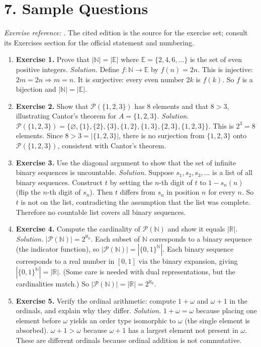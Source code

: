 \section*{7. Sample Questions}
\emph{Exercise reference:} \cite{set_ref1}. The cited edition is the source for the exercise set; consult its Exercises section for the official statement and numbering.
\begin{enumerate}[leftmargin=*,itemsep=0.9em]
\item \textbf{Exercise 1.} Prove that $|\mathbb{N}|=|\mathbb{E}|$ where $\mathbb{E}=\{2,4,6,\ldots\}$ is the set of even positive integers. \emph{Solution.} Define $f\colon\mathbb{N}\to\mathbb{E}$ by $f(n)=2n$. This is injective: $2m=2n\Rightarrow m=n$. It is surjective: every even number $2k$ is $f(k)$. So $f$ is a bijection and $|\mathbb{N}|=|\mathbb{E}|$.

\item \textbf{Exercise 2.} Show that $\mathcal{P}(\{1,2,3\})$ has $8$ elements and that $8>3$, illustrating Cantor's theorem for $A=\{1,2,3\}$. \emph{Solution.} $\mathcal{P}(\{1,2,3\})=\{\varnothing,\{1\},\{2\},\{3\},\{1,2\},\{1,3\},\{2,3\},\{1,2,3\}\}$. This is $2^3=8$ elements. Since $8>3=|\{1,2,3\}|$, there is no surjection from $\{1,2,3\}$ onto $\mathcal{P}(\{1,2,3\})$, consistent with Cantor's theorem.

\item \textbf{Exercise 3.} Use the diagonal argument to show that the set of infinite binary sequences is uncountable. \emph{Solution.} Suppose $s_1,s_2,s_3,\ldots$ is a list of all binary sequences. Construct $t$ by setting the $n$-th digit of $t$ to $1-s_n(n)$ (flip the $n$-th digit of $s_n$). Then $t$ differs from $s_n$ in position $n$ for every $n$. So $t$ is not on the list, contradicting the assumption that the list was complete. Therefore no countable list covers all binary sequences.

\item \textbf{Exercise 4.} Compute the cardinality of $\mathcal{P}(\mathbb{N})$ and show it equals $|\mathbb{R}|$. \emph{Solution.} $|\mathcal{P}(\mathbb{N})|=2^{\aleph_0}$. Each subset of $\mathbb{N}$ corresponds to a binary sequence (the indicator function), so $|\mathcal{P}(\mathbb{N})|=|\{0,1\}^{\mathbb{N}}|$. Each binary sequence corresponds to a real number in $[0,1]$ via the binary expansion, giving $|\{0,1\}^{\mathbb{N}}|=|\mathbb{R}|$. (Some care is needed with dual representations, but the cardinalities match.) So $|\mathcal{P}(\mathbb{N})|=|\mathbb{R}|=2^{\aleph_0}$.

\item \textbf{Exercise 5.} Verify the ordinal arithmetic: compute $1+\omega$ and $\omega+1$ in the ordinals, and explain why they differ. \emph{Solution.} $1+\omega=\omega$ because placing one element before $\omega$ yields an order type isomorphic to $\omega$ (the single element is absorbed). $\omega+1>\omega$ because $\omega+1$ has a largest element not present in $\omega$. These are different ordinals because ordinal addition is not commutative.

\end{enumerate}

